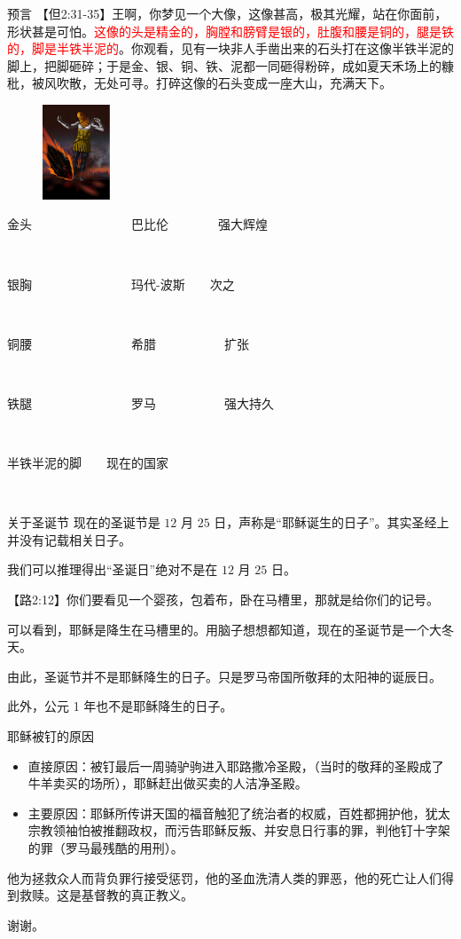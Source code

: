 \documentclass[UTF8]{ctexbeamer}
\begin{document}
	\begin{frame}{预言}
		【但2:31-35】王啊，你梦见一个大像，这像甚高，极其光耀，站在你面前，形状甚是可怕。\textcolor{red}{这像的头是精金的，胸膛和膀臂是银的，肚腹和腰是铜的，腿是铁的，脚是半铁半泥的}。你观看，见有一块非人手凿出来的石头打在这像半铁半泥的脚上，把脚砸碎；于是金、银、铜、铁、泥都一同砸得粉碎，成如夏天禾场上的糠秕，被风吹散，无处可寻。打碎这像的石头变成一座大山，充满天下。
		\pause
		\begin{figure}
			\includegraphics[width=2cm]{picture/6.png}
		\end{figure}
		\pause
		金头~~~~~~~~~~~~~~~~巴比伦~~~~~~~~强大辉煌\par
		~\par
		\pause
		银胸~~~~~~~~~~~~~~~~玛代-波斯~~~~次之\par
		~\par
		\pause
		铜腰~~~~~~~~~~~~~~~~希腊~~~~~~~~~~~扩张\par
		~\par
		\pause
		铁腿~~~~~~~~~~~~~~~~罗马~~~~~~~~~~~强大持久\par
		~\par
		\pause
		半铁半泥的脚~~~~现在的国家\par 
		~\par
	\end{frame}
	\begin{frame}{关于圣诞节}
		现在的圣诞节是 $12$ 月 $25$ 日，声称是“耶稣诞生的日子”。其实圣经上并没有记载相关日子。\par\pause
		我们可以推理得出“圣诞日”绝对不是在 $12$ 月 $25$ 日。\par\pause
		【路2:12】你们要看见一个婴孩，包着布，卧在马槽里，那就是给你们的记号。\par\pause
		可以看到，耶稣是降生在马槽里的。\pause 用脑子想想都知道，现在的圣诞节是一个大冬天。\par\pause
		由此，圣诞节并不是耶稣降生的日子。只是罗马帝国所敬拜的太阳神的诞辰日。\par\pause
		此外，公元 1 年也不是耶稣降生的日子。\par
	\end{frame}
	\begin{frame}{耶稣被钉的原因}
		\pause
		\begin{itemize}
			\item 直接原因：被钉最后一周骑驴驹进入耶路撒冷圣殿，（当时的敬拜的圣殿成了牛羊卖买的场所），耶稣赶出做买卖的人洁净圣殿。\par\pause
			\item 主要原因：耶稣所传讲天国的福音触犯了统治者的权威，百姓都拥护他，犹太宗教领袖怕被推翻政权，而污告耶稣反叛、并安息日行事的罪，判他钉十字架的罪（罗马最残酷的用刑）。\par\pause
		\end{itemize}
		他为拯救众人而背负罪行接受惩罚，他的圣血洗清人类的罪恶，他的死亡让人们得到救赎。这是基督教的真正教义。
	\end{frame}
	\begin{frame}{}
		谢谢。
	\end{frame}
	
	
	
\end{document}
